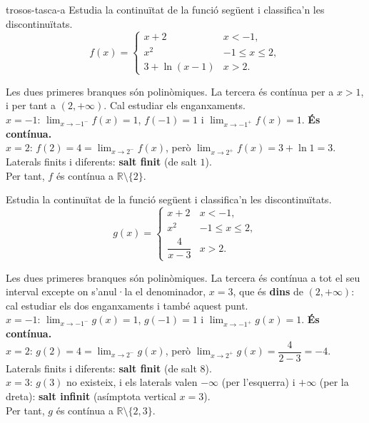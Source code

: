 \begin{apartats}

\begin{tria}{trosos-tasca-a}
Estudia la continuïtat de la funció següent i classifica'n les discontinuïtats.
\[
f(x)=\begin{cases}
  x+2 & \si{x<-1},\\[3pt]
  x^2 & \si{-1\le x\le 2},\\[3pt]
  3+\ln(x-1) & \si{x>2}.
\end{cases}
\]

\begin{solucio}
Les dues primeres branques són polinòmiques. La tercera és contínua per a $x>1$, i per
tant a $(2,+\infty)$. Cal estudiar els enganxaments.\\
$x=-1$: $\lim_{x\to-1^-}f(x)=1$, $f(-1)=1$ i $\lim_{x\to-1^+}f(x)=1$. \textbf{És contínua.}\\
$x=2$: $f(2)=4=\lim_{x\to2^-}f(x)$, però $\lim_{x\to2^+}f(x)=3+\ln1=3$.
Laterals finits i diferents: \textbf{salt finit} (de salt $1$).\\
Per tant, $f$ és contínua a $\mathbb{R}\setminus\{2\}$.
\end{solucio}

Estudia la continuïtat de la funció següent i classifica'n les discontinuïtats.
\[
g(x)=\begin{cases}
  x+2 & \si{x<-1},\\[3pt]
  x^2 & \si{-1\le x\le 2},\\[6pt]
  \dfrac{4}{x-3} & \si{x>2}.
\end{cases}
\]

\begin{solucio}
Les dues primeres branques són polinòmiques. La tercera és contínua a tot el seu interval
excepte on s'anul·la el denominador, $x=3$, que és \textbf{dins} de $(2,+\infty)$: cal
estudiar els dos enganxaments i també aquest punt.\\
$x=-1$: $\lim_{x\to-1^-}g(x)=1$, $g(-1)=1$ i $\lim_{x\to-1^+}g(x)=1$. \textbf{És contínua.}\\
$x=2$: $g(2)=4=\lim_{x\to2^-}g(x)$, però $\lim_{x\to2^+}g(x)=\dfrac{4}{2-3}=-4$.
Laterals finits i diferents: \textbf{salt finit} (de salt $8$).\\
$x=3$: $g(3)$ no existeix, i els laterals valen $-\infty$ (per l'esquerra) i $+\infty$ (per la
dreta): \textbf{salt infinit} (asímptota vertical $x=3$).\\
Per tant, $g$ és contínua a $\mathbb{R}\setminus\{2,3\}$.
\end{solucio}
\end{tria}


\end{apartats}
